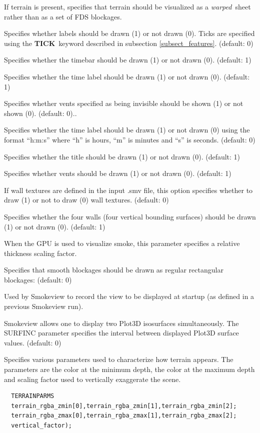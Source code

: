 \documentclass[11pt,twoside]{book}
\newcommand{\hitem}[1]{\item[{\bf #1} \hfill]}
\begin{document}
\hitem{SHOWTERRAIN} If terrain is present, specifies that terrain should be visualized as a {\em warped}\ sheet
rather than as a set of FDS blockages.

\hitem{SHOWTICKS} Specifies whether labels should be drawn (1) or
not drawn (0).  Ticks are specified using the {\bf TICK}\ keyword
described in subsection \ref{subsect_features}. (default: 0)

\hitem{SHOWTIMEBAR}Specifies whether the timebar should be drawn
(1) or not drawn (0). (default: 1)

\hitem{SHOWTIMELABEL} Specifies whether the time label should be
drawn (1) or not drawn (0). (default: 1)

\hitem{SHOWTRANSPARENTVENTS} Specifies whether vents specified as being invisible should be
shown (1) or not shown (0). (default: 0)..

\hitem{SHOWHMSTIMELABEL}Specifies whether the time label should be
drawn (1) or not drawn (0) using the format ``h:m:s'' where ``h''
is hours, ``m'' is minutes and ``s'' is seconds.  (default: 0)

\hitem{SHOWTITLE}Specifies whether
the title should be drawn (1) or not drawn (0).
(default: 1)

\hitem{SHOWVENTS} Specifies whether vents should be drawn
(1) or not drawn (0).  (default: 1)

\hitem{SHOWALLTEXTURES} If wall textures are defined in the input .smv file, this
option specifies whether to draw (1) or not to draw (0) wall textures.
(default: 0)


\hitem{SHOWWALLS}Specifies whether
the four walls (four vertical bounding surfaces) should be drawn (1) or not drawn (0).
(default: 1)

\hitem{SMOKERTHICK} When the GPU is used to visualize smoke, this parameter specifies a
relative thickness scaling factor.

\hitem{SMOOTHBLOCKSOLID}  Specifies that smooth blockages should be drawn as regular rectangular blockages: (default: 0)

\hitem{STARTUPVIEW}Used by Smokeview to record the view to be
displayed at startup (as defined in a previous Smokeview run).

\hitem{SURFINC}Smokeview allows one to display two Plot3D
isosurfaces simultaneously.  The SURFINC parameter specifies the
interval between displayed Plot3D surface values. (default: 0)

\hitem{TERRAINPARMS} Specifies various parameters used to characterize
how terrain appears.  The parameters are the color at the minimum depth,
the color at the maximum depth and scaling factor used to vertically exaggerate
the scene.
\begin{verbatim}
  TERRAINPARMS
  terrain_rgba_zmin[0],terrain_rgba_zmin[1],terrain_rgba_zmin[2];
  terrain_rgba_zmax[0],terrain_rgba_zmax[1],terrain_rgba_zmax[2];
  vertical_factor);
\end{verbatim}
\end{document}
